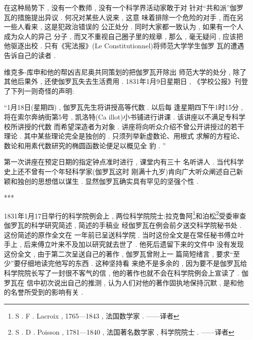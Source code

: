 在这种局势下 , 没有一个教师 , 没有一个科学界活动家敢于对 针对“共和派”伽罗瓦的措施提出异议 . 何况对某些人说来 , 这意 味着排除一个危险的对手 , 而在另一些人看来 , 这是犯政治错误的 公正处分 . 同时大家都一致认为 , 如果有一个人成为众人的异己 分子 , 而又不重视自己圈子里的规章 , 那么 , 毫无疑问 , 应该把他驱逐出校 . 只有《宪法报》(Le Constitutionnel)将师范大学学生伽罗 瓦的遭遇告诉自己的读者 . 

维克多-库申和他的帮凶吉尼奥共同策划的把伽罗瓦开除出 师范大学的处分 , 除了其他后果外 , 还使伽罗瓦失去生活费用 .  1831年1月9日星期日 , 《学校公报》刊登了下列一则奇怪的声明:

“1月18日(星期四) , 伽罗瓦先生将讲授高等代数 . 以后每 逢星期四下午1时15分 , 将在索尔奔纳街第5号 , 凯洛特(Ca illot)小书铺进行讲课 . 该讲座以不满足专科学校所讲授的代数 而希望深造者为对象 . 讲座将向听众介绍不曾公开讲授过的若干 理论 . 其中某些理论完全是独创的 . 只须列举新虚数论、用根式 求解的方程论、数论和用素代数研究的椭圆函数论便足以概见全 豹 . ”

第一次讲座在预定日期的指定钟点准时进行 , 课堂内有三十 名听讲人 . 当代科学史上还不曾有一个年轻科学家(伽罗瓦这时 刚满十九岁)肯向广大听众阐述自己新颖和独创的思想借以谋生 .  显然伽罗瓦确实具有罕见的坚强个性 . 

\begin{center}***
\end{center}

1831年1月17日举行的科学院例会上 , 两位科学院院士:拉克鲁阿\footnote{S . F . Lacroix , 1765—1843 , 法国数学家 . ——译者}和泊松\footnote{S . D . Poisson , 1781—1840 , 法国著名数学家 , 科学院院士 . ——译者}受委审查伽罗瓦的科学研究简述 , 简述的手稿业 经伽罗瓦在例会前夕送交科学院秘书处 . 这份简述的原作全文在 一年前已呈送科学院 . 当时这份全文是在常任秘书傅立叶手上 ,  后来傅立叶来不及加以研究就去世了 . 他死后遗留下来的文件中 没有发现这份全文 , 由于第二次呈送自己的著作 , 伽罗瓦曾附上一 篇简短绪言 , 要求“至少”要仔细地读完他写的东西 . 这种坚持看 来绝不是多余的 , 因为要不是伽罗瓦给科学院院长写了一封很不客气的信 , 他的著作也就不会在科学院例会上宣读了 . 伽罗瓦在 信中初次说出自己的推测 , 认为人们对他的著作固执地保持沉默 ,  是和他的名誉所受到的影响有关 . 

